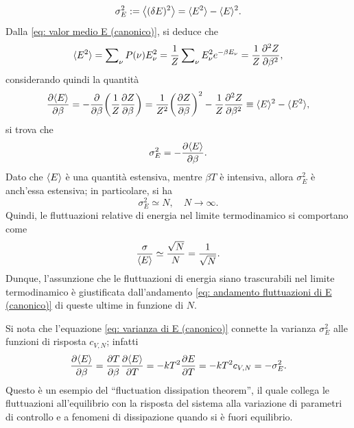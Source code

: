 \begin{equation}
    \sigma^2_E := \left\langle (\delta E)^2 \right\rangle = \langle E^2 \rangle - \langle E \rangle^2.
\end{equation}
Dalla \eqref{eq: valor medio E (canonico)}, si deduce che
\begin{equation}
    \langle E^2 \rangle = \sum\nolimits_\nu P(\nu)E_\nu^2 = \frac{1}{Z}\sum\nolimits_\nu E_\nu^2 e^{-\beta E_\nu} = \frac{1}{Z}\frac{\partial^2Z}{\partial\beta^2},
\end{equation}
considerando quindi la quantità
\begin{equation}
    \frac{\partial\langle E \rangle}{\partial\beta} = -\frac{\partial}{\partial\beta}\bigg(\frac{1}{Z}\frac{\partial Z}{\partial\beta}\bigg) = \frac{1}{Z^2}\bigg(\frac{\partial Z}{\partial\beta}\bigg)^2 - \frac{1}{Z}\frac{\partial^2Z}{\partial\beta^2} \equiv \langle E \rangle^2 - \langle E^2 \rangle,
\end{equation}
si trova che
\begin{equation}
\label{eq: varianza di E (canonico)}
    \sigma_E^2 = - \frac{\partial\langle E \rangle}{\partial\beta}.
\end{equation}
Dato che $\langle E \rangle$ è una quantità estensiva, mentre $\beta T$ è intensiva, allora $\sigma^2_E$ è anch'essa estensiva; in particolare, si ha
\begin{equation}
    \sigma_E^2 \simeq N,\quad N\to\infty.
\end{equation}
Quindi, le fluttuazioni relative di energia nel limite termodinamico si comportano come
\begin{equation}
\label{eq: andamento fluttuazioni di E (canonico)}
    \frac{\sigma}{\langle E \rangle} \simeq \frac{\sqrt{N}}{N} = \frac{1}{\sqrt{N}}.
\end{equation}
Dunque, l'assunzione che le fluttuazioni di energia siano trascurabili nel limite termodinamico è giustificata dall'andamento \eqref{eq: andamento fluttuazioni di E (canonico)} di queste ultime in funzione di $N$.
\begin{obs}
    Si nota che l'equazione \eqref{eq: varianza di E (canonico)} connette la varianza $\sigma^2_E$ alle funzioni di risposta $c_{V,N}$; infatti
    \begin{equation}
    \label{eq: relazione tra le fluttuazioni di E e cV,N (canonico)}
        \frac{\partial\langle E \rangle}{\partial\beta} = \frac{\partial T}{\partial\beta}\frac{\partial\langle E \rangle}{\partial T} = -kT^2\frac{\partial E}{\partial T} = -kT^2c_{V,N} = -\sigma_E^2.
    \end{equation}
    Questo è un esempio del ``fluctuation dissipation theorem'', il quale collega le fluttuazioni all'equilibrio con la risposta del sistema alla variazione di parametri di controllo e a fenomeni di dissipazione quando si è fuori equilibrio.
\end{obs}

